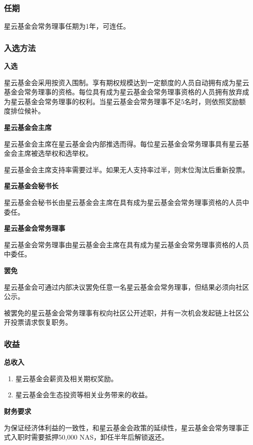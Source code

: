 \subsubsection{任期}

星云基金会常务理事任期为1年，可连任。

\subsubsection{入选方法}

\textbf{入选}

星云基金会采用按资入围制。享有期权规模达到一定额度的人员自动拥有成为星云基金会常务理事的资格。每位具有成为星云基金会常务理事资格的人员拥有放弃成为星云基金会常务理事的权利。当星云基金会常务理事不足5名时，则依照奖励额度排位候补。

\textbf{星云基金会主席}

星云基金会主席在星云基金会内部推选而得。每位星云基金会常务理事具有星云基金会主席被选举权和选举权。

星云基金会主席支持率需要过半。如果无人支持率过半，则末位淘汰后重新投票。

\textbf{星云基金会秘书长}

星云基金会秘书长由星云基金会主席在具有成为星云基金会常务理事资格的人员中委任。

\textbf{星云基金会常务理事}

星云基金会常务理事由星云基金会主席在具有成为星云基金会常务理事资格的人员中委任。

\textbf{罢免}

星云基金会可通过内部决议罢免任意一名星云基金会常务理事，但结果必须向社区公示。

被罢免的星云基金会常务理事有权向社区公开述职，并有一次机会发起链上社区公开投票请求恢复职务。

\subsubsection{收益}

\textbf{总收入}

\begin{enumerate}
	\item 星云基金会薪资及相关期权奖励。
    \item 星云基金会生态投资等相关业务带来的收益。
\end{enumerate}

\textbf{财务要求}

为保证经济体利益的一致性，和星云基金会政策的延续性，星云基金会常务理事正式入职时需要抵押50,000 NAS，卸任半年后解锁返还。

